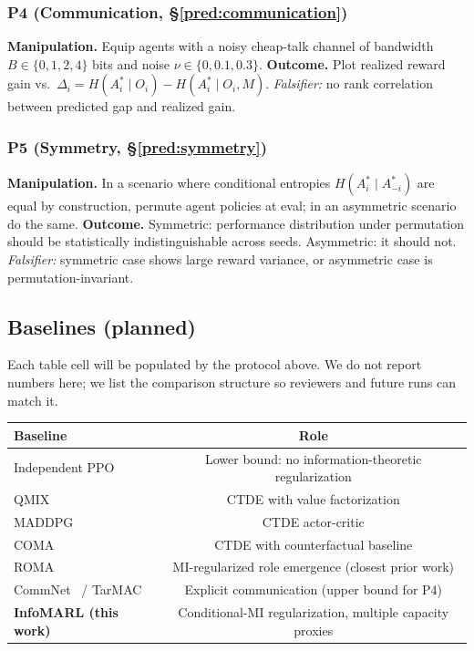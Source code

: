 \documentclass[10pt, letterpaper]{article}
\begin{document}
\subsubsection*{P4 (Communication, \S\ref{pred:communication})}
\textbf{Manipulation.} Equip agents with a noisy cheap-talk channel of bandwidth $B \in \{0, 1, 2, 4\}$ bits and noise $\nu \in \{0, 0.1, 0.3\}$.
\textbf{Outcome.} Plot realized reward gain vs.\ $\Delta_i = H(A_i^*\mid O_i) - H(A_i^*\mid O_i, M)$. \emph{Falsifier:} no rank correlation between predicted gap and realized gain.

\subsubsection*{P5 (Symmetry, \S\ref{pred:symmetry})}
\textbf{Manipulation.} In a scenario where conditional entropies $H(A_i^*\mid A_{-i}^*)$ are equal by construction, permute agent policies at eval; in an asymmetric scenario do the same.
\textbf{Outcome.} Symmetric: performance distribution under permutation should be statistically indistinguishable across seeds. Asymmetric: it should not. \emph{Falsifier:} symmetric case shows large reward variance, or asymmetric case is permutation-invariant.

\subsection{Baselines (planned)}

Each table cell will be populated by the protocol above. We do not report numbers here; we list the comparison structure so reviewers and future runs can match it.

\begin{center}
\begin{tabular}{lc}
\toprule
\textbf{Baseline} & \textbf{Role} \\
\midrule
Independent PPO~\cite{schulman2017ppo} & Lower bound: no information-theoretic regularization \\
QMIX~\cite{rashid2018qmix} & CTDE with value factorization \\
MADDPG~\cite{lowe2017maddpg} & CTDE actor-critic \\
COMA~\cite{foerster2018coma} & CTDE with counterfactual baseline \\
ROMA~\cite{wang2020roma} & MI-regularized role emergence (closest prior work) \\
CommNet~\cite{sukhbaatar2016} / TarMAC~\cite{das2019tarmac} & Explicit communication (upper bound for P4) \\
\textbf{InfoMARL (this work)} & Conditional-MI regularization, multiple capacity proxies \\
\bottomrule
\end{tabular}
\end{center}
\end{document}
